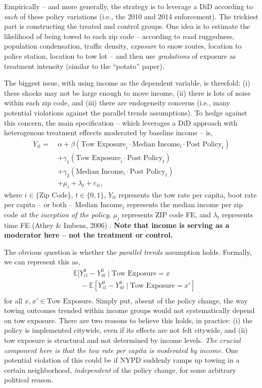 \documentclass[12pt,letterpaper,doublespace, oneside]{article}
\begin{document}
Empirically -- and more generally, the strategy is to leverage a DiD according to \emph{each} of these policy variations (i.e., the 2010 and 2014 enforcement). The trickiest part is constructing the treated and control groups. One idea is to estimate the likelihood of being towed to each zip code -- according to road ruggedness, population condensation, traffic density, \emph{exposure} to snow routes, location to police station, location to tow lot -- and then use \emph{gradations} of exposure as treatment intensity (similar to the \enquote{potato} paper). 

The biggest issue, with using income as the dependent variable, is threefold: (i) these shocks may not be large enough to move income, (ii) there is lots of noise within each zip code, and (iii) there are endogeneity concerns (i.e., many potential violations against the parallel trends assumptions). To hedge against this concern, the main specification -- which leverages a DiD approach with heterogenous treatment effeccts moderated by baseline income -- is,
\begin{align}
Y_{it} = \ & \alpha 
+ \beta(\text{Tow Exposure}_i \cdot \text{Median Income}_i \cdot \text{Post Policy}_t) \nonumber \\
& + \gamma_1(\text{Tow Exposure}_i \cdot \text{Post Policy}_t) \nonumber \\
& + \gamma_2(\text{Median Income}_i \cdot \text{Post Policy}_t) \nonumber \\
& + \mu_i + \lambda_t + \varepsilon_{it},
\end{align}
where $i \in \{\text{Zip Code}\}$, $t \in \{0,1\}$, $Y_{it}$ represents the tow rate per capita, boot rate per capita -- or both -- $\text{Median Income}_i$ represents the median income per zip code \emph{at the inception of the policy}, $\mu_i$ represents ZIP code FE, and $\lambda_t$ represents time FE (Athey \& Imbens, 2006) \cite{Athey}. \textbf{Note that income is serving as a moderator here -- not the treatment or control.}

 The obvious question is whether the \emph{parallel trends} assumption holds. Formally, we can represent this as,
\begin{align}
& \mathbb{E}[Y_{i1}^0-Y_{i0}^0 \mid \text{Tow Exposure} = x \nonumber \\
& \quad - \mathbb{E}[Y_{i1}^0-Y_{i0}^0 \mid \text{Tow Exposure} = x'] \nonumber \\
\end{align}
for all $x,x' \in \text{Tow Exposure}$. Simply put, absent of the policy change, the way towing outcomes trended within income groups would not systematically depend on tow exposure. There are two reasons to believe this holds, in practice: (i) the policy is implemented citywide, even if its effects are not felt citywide, and (ii) tow exposure is structural and not determined by income levels. \emph{The crucial component here is that the tow rate per capita is moderated by income.} One potential violation of this could be if NYPD suddenly ramps up towing in a certain neighborhood, \emph{independent} of the policy change, for some arbitrary political reason. 
\end{document}
